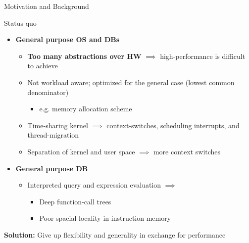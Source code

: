 \begin{block}{Motivation and Background}

{Status quo}
  \begin{itemize}
  \item \textbf{General purpose OS and DBs}%
    \begin{itemize}
     \item \textbf{Too many abstractions over HW} $\implies$ high-performance is difficult
      to achieve~\cite{GICEVA:2016:OS_SUPPORT,HALE:2015:NAUTILUS}
    \item Not workload aware; optimized for the general case (lowest common denominator)
      \begin{itemize}
      \item e.g. memory allocation scheme
      \end{itemize}
    \item Time-sharing kernel $\implies$ context-switches, scheduling interrupts, and thread-migration
    \item Separation of kernel and user space $\implies$ more context switches
    \end{itemize}
  \item \textbf{General purpose DB}
    \begin{itemize}
    \item Interpreted query and expression evaluation  $\implies$
      \begin{itemize}
      \item Deep function-call trees
      \item Poor spacial locality in instruction memory
    \end{itemize}
    \end{itemize}
  \end{itemize}

  \begin{center}
    \alert{\textbf{Solution:} Give up flexibility and generality in exchange for performance}
  \end{center}
   

\end{block}
